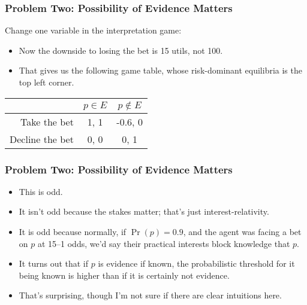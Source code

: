 \begin{frame}

\frametitle{Problem Two: Possibility of Evidence Matters}
\label{problemtwo:possibilityofevidencematters}

Change one variable in the interpretation game:

\begin{itemize}
\item Now the downside to losing the bet is 15 utils, not 100.

\item That gives us the following game table, whose risk-dominant equilibria is the top left corner.

\end{itemize}


\begin{center}
\begin{tabular}{r | c c}
& $p \in E$ & $p \notin E$ \\ \hline
Take the bet & 1, 1 & -0.6, 0 \\
Decline the bet & 0, 0 & 0, 1
\end{tabular}
\end{center}


\end{frame}

\begin{frame}

\frametitle{Problem Two: Possibility of Evidence Matters}
\label{problemtwo:possibilityofevidencematters}

\begin{itemize}
\item This is odd.

\item It isn't odd because the stakes matter; that's just interest-relativity.

\item It is odd because normally, if $\Pr(p) = 0.9$, and the agent was facing a bet on $p$ at 15--1 odds, we'd say their practical interests block knowledge that $p$.

\item It turns out that if $p$ is evidence if known, the probabilistic threshold for it being known is higher than if it is certainly not evidence.

\item That's surprising, though I'm not sure if there are clear intuitions here.

\end{itemize}

\end{frame}

